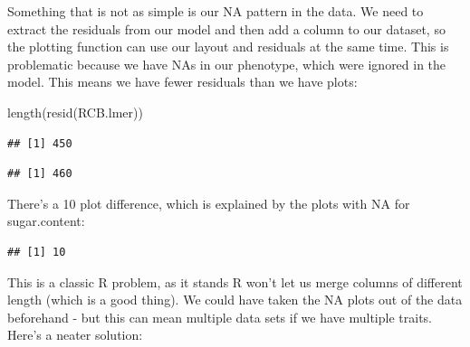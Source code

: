 \documentclass[
]{book}
\newenvironment{Shaded}{\begin{snugshade}}{\end{snugshade}}
\newcommand{\CommentTok}[1]{\textcolor[rgb]{0.56,0.35,0.01}{\textit{#1}}}
\newcommand{\ConstantTok}[1]{\textcolor[rgb]{0.00,0.00,0.00}{#1}}
\newcommand{\FunctionTok}[1]{\textcolor[rgb]{0.00,0.00,0.00}{#1}}
\newcommand{\NormalTok}[1]{#1}
\newcommand{\OtherTok}[1]{\textcolor[rgb]{0.56,0.35,0.01}{#1}}
\newcommand{\SpecialCharTok}[1]{\textcolor[rgb]{0.00,0.00,0.00}{#1}}
\begin{document}
Something that is not as simple is our NA pattern in the data. We need to extract the residuals from our model and then add a column to our dataset, so the plotting function can use our layout and residuals at the same time. This is problematic because we have NAs in our phenotype, which were ignored in the model. This means we have fewer residuals than we have plots:

\begin{Shaded}
\begin{Highlighting}[]
\FunctionTok{length}\NormalTok{(}\FunctionTok{resid}\NormalTok{(RCB.lmer))}
\end{Highlighting}
\end{Shaded}

\begin{verbatim}
## [1] 450
\end{verbatim}

\begin{Shaded}
\end{Shaded}

\begin{verbatim}
## [1] 460
\end{verbatim}

There's a 10 plot difference, which is explained by the plots with NA for sugar.content:

\begin{Shaded}
\end{Shaded}

\begin{verbatim}
## [1] 10
\end{verbatim}

This is a classic R problem, as it stands R won't let us merge columns of different length (which is a good thing). We could have taken the NA plots out of the data beforehand - but this can mean multiple data sets if we have multiple traits. Here's a neater solution:

\begin{Shaded}
\end{Shaded}
\end{document}
